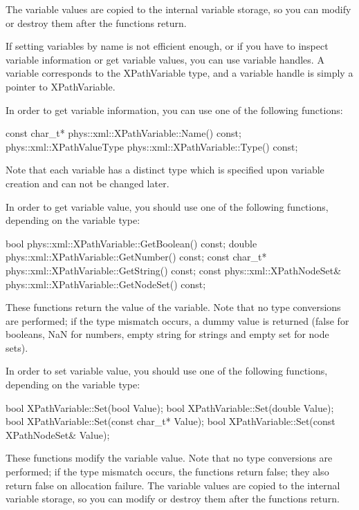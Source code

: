  The variable values are copied to the internal variable storage, so you can modify or destroy them after the functions return. \par
 \par
 If setting variables by name is not efficient enough, or if you have to inspect variable information or get variable values, you can use variable handles. A variable corresponds to the XPathVariable type, and a variable handle is simply a pointer to XPathVariable. \par
 \par
 In order to get variable information, you can use one of the following functions: 
\begin{DoxyCode}
 const char_t* phys::xml::XPathVariable::Name() const;
 phys::xml::XPathValueType phys::xml::XPathVariable::Type() const;
\end{DoxyCode}
 Note that each variable has a distinct type which is specified upon variable creation and can not be changed later. \par
 \par
 In order to get variable value, you should use one of the following functions, depending on the variable type: 
\begin{DoxyCode}
 bool phys::xml::XPathVariable::GetBoolean() const;
 double phys::xml::XPathVariable::GetNumber() const;
 const char_t* phys::xml::XPathVariable::GetString() const;
 const phys::xml::XPathNodeSet& phys::xml::XPathVariable::GetNodeSet() const;
\end{DoxyCode}
 These functions return the value of the variable. Note that no type conversions are performed; if the type mismatch occurs, a dummy value is returned (false for booleans, NaN for numbers, empty string for strings and empty set for node sets). \par
 \par
 In order to set variable value, you should use one of the following functions, depending on the variable type: 
\begin{DoxyCode}
 bool XPathVariable::Set(bool Value);
 bool XPathVariable::Set(double Value);
 bool XPathVariable::Set(const char_t* Value);
 bool XPathVariable::Set(const XPathNodeSet& Value);
\end{DoxyCode}
 These functions modify the variable value. Note that no type conversions are performed; if the type mismatch occurs, the functions return false; they also return false on allocation failure. The variable values are copied to the internal variable storage, so you can modify or destroy them after the functions return. \par
